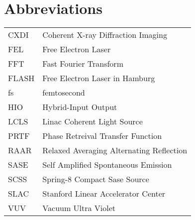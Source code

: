 \chapter*{Abbreviations}\label{sec:abrv}

\begin{tabular}{ll}
CXDI    &Coherent X-ray Diffraction Imaging\\
FEL     &Free Electron Laser\\
FFT     &Fast Fourier Transform\\
FLASH   &Free Electron Laser in Hamburg\\
fs      &femtosecond\\
HIO     &Hybrid-Input Output\\
LCLS    &Linac Coherent Light Source\\
PRTF    &Phase Retreival Transfer Function\\
RAAR    &Relaxed Averaging Alternating Reflection\\
SASE    &Self Amplified Spontaneous Emission\\  
SCSS    &Spring-8 Compact Sase Source\\
SLAC    &Stanford Linear Accelerator Center\\
VUV     &Vacuum Ultra Violet\\

\end{tabular}
